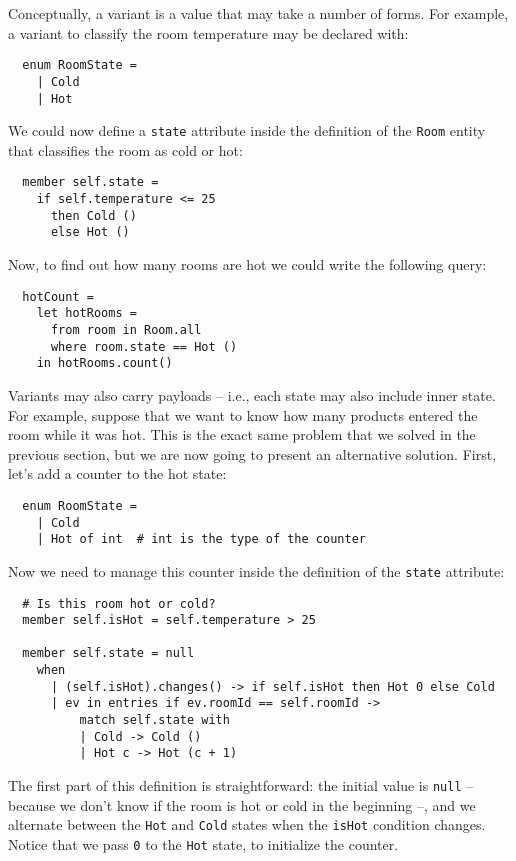 \documentclass[a4,11pt]{report}
\begin{document}
Conceptually, a variant is a value that may take a number of
forms. For example, a variant to classify the room temperature may be
declared with:

\begin{lstlisting}
  enum RoomState =
    | Cold
    | Hot
\end{lstlisting}

We could now define a \verb=state= attribute inside the definition of
the \verb=Room= entity that classifies the room as cold or hot:

\begin{lstlisting}
  member self.state =
    if self.temperature <= 25
      then Cold ()
      else Hot ()
\end{lstlisting}

Now, to find out how many rooms are hot we could write the following query:

\begin{lstlisting}
  hotCount =
    let hotRooms =
      from room in Room.all
      where room.state == Hot ()
    in hotRooms.count()
\end{lstlisting}

Variants may also carry payloads -- i.e., each state may also include
inner state. For example, suppose that we want to know how many
products entered the room while it was hot. This is the exact same
problem that we solved in the previous section, but we are now going
to present an alternative solution. First, let's add a counter to the
hot state:

\begin{lstlisting}
  enum RoomState =
    | Cold
    | Hot of int  # int is the type of the counter
\end{lstlisting}

Now we need to manage this counter inside the definition of the
\verb=state= attribute:

\begin{lstlisting}
  # Is this room hot or cold?
  member self.isHot = self.temperature > 25

  member self.state = null
    when
      | (self.isHot).changes() -> if self.isHot then Hot 0 else Cold
      | ev in entries if ev.roomId == self.roomId ->
          match self.state with
          | Cold -> Cold ()
          | Hot c -> Hot (c + 1)

\end{lstlisting}


The first part of this definition is straightforward: the initial
value is \verb=null= -- because we don't know if the room is hot or
cold in the beginning --, and we alternate between the \verb=Hot= and
\verb=Cold= states when the \verb=isHot= condition changes. Notice
that we pass \verb=0= to the \verb=Hot= state, to initialize the
counter.
\end{document}
